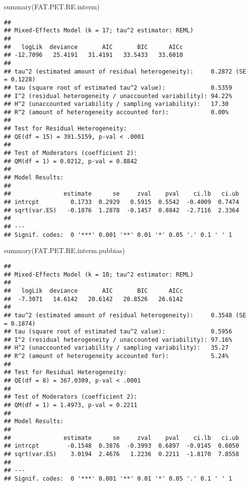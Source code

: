 \documentclass[
]{book}
\newenvironment{Shaded}{\begin{snugshade}}{\end{snugshade}}
\newcommand{\FunctionTok}[1]{\textcolor[rgb]{0.00,0.00,0.00}{#1}}
\newcommand{\NormalTok}[1]{#1}
\theoremstyle{definition}
\theoremstyle{definition}
\theoremstyle{definition}
\theoremstyle{definition}
\theoremstyle{remark}
\begin{document}
\begin{Shaded}
\begin{Highlighting}[]
\FunctionTok{summary}\NormalTok{(FAT.PET.RE.interm)}
\end{Highlighting}
\end{Shaded}

\begin{verbatim}
## 
## Mixed-Effects Model (k = 17; tau^2 estimator: REML)
## 
##   logLik  deviance       AIC       BIC      AICc 
## -12.7096   25.4191   31.4191   33.5433   33.6010   
## 
## tau^2 (estimated amount of residual heterogeneity):     0.2872 (SE = 0.1228)
## tau (square root of estimated tau^2 value):             0.5359
## I^2 (residual heterogeneity / unaccounted variability): 94.22%
## H^2 (unaccounted variability / sampling variability):   17.30
## R^2 (amount of heterogeneity accounted for):            0.00%
## 
## Test for Residual Heterogeneity:
## QE(df = 15) = 391.5159, p-val < .0001
## 
## Test of Moderators (coefficient 2):
## QM(df = 1) = 0.0212, p-val = 0.8842
## 
## Model Results:
## 
##               estimate      se     zval    pval    ci.lb   ci.ub 
## intrcpt         0.1733  0.2929   0.5915  0.5542  -0.4009  0.7474    
## sqrt(var.ES)   -0.1876  1.2878  -0.1457  0.8842  -2.7116  2.3364    
## 
## ---
## Signif. codes:  0 '***' 0.001 '**' 0.01 '*' 0.05 '.' 0.1 ' ' 1
\end{verbatim}

\begin{Shaded}
\begin{Highlighting}[]
\FunctionTok{summary}\NormalTok{(FAT.PET.RE.interm.pubbias)}
\end{Highlighting}
\end{Shaded}

\begin{verbatim}
## 
## Mixed-Effects Model (k = 10; tau^2 estimator: REML)
## 
##   logLik  deviance       AIC       BIC      AICc 
##  -7.3071   14.6142   20.6142   20.8526   26.6142   
## 
## tau^2 (estimated amount of residual heterogeneity):     0.3548 (SE = 0.1874)
## tau (square root of estimated tau^2 value):             0.5956
## I^2 (residual heterogeneity / unaccounted variability): 97.16%
## H^2 (unaccounted variability / sampling variability):   35.27
## R^2 (amount of heterogeneity accounted for):            5.24%
## 
## Test for Residual Heterogeneity:
## QE(df = 8) = 367.0309, p-val < .0001
## 
## Test of Moderators (coefficient 2):
## QM(df = 1) = 1.4973, p-val = 0.2211
## 
## Model Results:
## 
##               estimate      se     zval    pval    ci.lb   ci.ub 
## intrcpt        -0.1548  0.3876  -0.3993  0.6897  -0.9145  0.6050    
## sqrt(var.ES)    3.0194  2.4676   1.2236  0.2211  -1.8170  7.8558    
## 
## ---
## Signif. codes:  0 '***' 0.001 '**' 0.01 '*' 0.05 '.' 0.1 ' ' 1
\end{verbatim}
\end{document}

